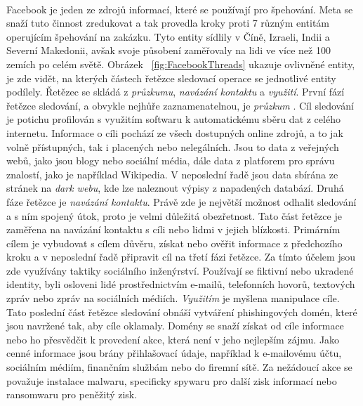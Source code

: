 ~

Facebook je jeden ze zdrojů informací, které se používají pro špehování.
Meta se snaží tuto činnost zredukovat a tak provedla kroky proti 7 různým entitám operujícím špehování na zakázku.
Tyto entity sídlily v Číně, Izraeli, Indii a Severní Makedonii, avšak svoje působení zaměřovaly na lidi ve více než 100 zemích po celém světě.
Obrázek ~\ref{fig:FacebookThreads} ukazuje ovlivněné entity, je zde vidět, na kterých částech řetězce sledovací operace se jednotlivé entity podílely.
Řetězec se skládá z \textit{průzkumu}, \textit{navázání kontaktu} a \textit{využití}.
První fází řetězce sledování, a obvykle nejhůře zaznamenatelnou, je \textit{průzkum} .
Cíl sledování je potichu profilován s využitím softwaru k automatickému sběru dat z celého internetu.
Informace o cíli pochází ze všech dostupných online zdrojů, a to jak volně přístupných, tak i placených nebo nelegálních.
Jsou to data z veřejných webů, jako jsou blogy nebo sociální média, dále data z platforem pro správu znalostí, jako je například Wikipedia.
V neposlední řadě jsou data sbírána ze stránek na \textit{dark webu}, kde lze naleznout výpisy z napadených databází.
Druhá fáze řetězce je \textit{navázání kontaktu}.
Právě zde je největší možnost odhalit sledování a s ním spojený útok, proto je velmi důležitá obezřetnost.
Tato část řetězce je zaměřena na navázání kontaktu s cíli nebo lidmi v jejich blízkosti.
Primárním cílem je vybudovat s cílem důvěru, získat nebo ověřit informace z předchozího kroku a v neposlední řadě připravit cíl na třetí fázi řetězce.
Za tímto účelem jsou zde využívány taktiky sociálního inženýrství.
Používají se fiktivní nebo ukradené identity, byli osloveni lidé prostřednictvím e-mailů, telefonních hovorů, textových zpráv nebo zpráv na sociálních médiích.
\textit{Využitím} je myšlena manipulace cíle.
Tato poslední část řetězce sledování obnáší vytváření phishingových domén, které jsou navržené tak, aby cíle oklamaly.
Domény se snaží získat od cíle informace nebo ho přesvědčit k provedení akce, která není v jeho nejlepším zájmu.
Jako cenné informace jsou brány přihlašovací údaje, například k  e-mailovému účtu, sociálním médiím, finančním službám nebo do  firemní sítě.
Za nežádoucí akce se považuje instalace malwaru, specificky spywaru pro další zisk informací nebo ransomwaru pro peněžitý zisk.\cite{pegasus_facebook}


